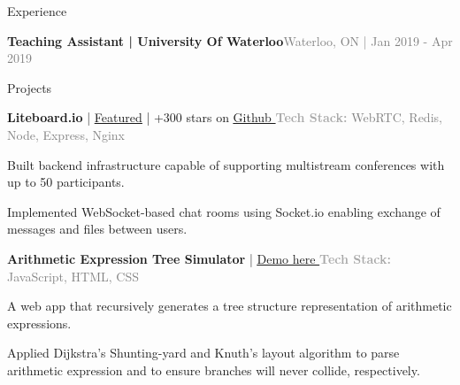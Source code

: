 \documentclass[hidelinks]{resume} %
\begin{document}
\begin{rSection}{Experience}
\begin{rSubsection}{\textbf{Teaching Assistant | University Of Waterloo}}{\textcolor{gray}{\small Waterloo, ON | Jan 2019 - Apr 2019}}{}
\end{rSubsection}

\end{rSection}

\vspace{-.05cm}


\begin{rSection}{Projects}
\vspace{-.1cm}
\begin{rSubsection}{\textbf{Liteboard.io} | \href{https://falauniversidades.com.br/projeto-gratuito-simplifica-o-acesso-as-aulas-on-line/}{\underline{Featured}} | +300 stars on \href{https://github.com/jeverd/lecture-experience}{\underline{Github} \faGithub}}{\small \textcolor{darkgray}{\textbf{Tech Stack:} \textcolor{gray}{WebRTC, Redis, Node, Express, Nginx}}}{}
        \par
        \begin{bulletpoints}
            \vspace{-.10cm}
            \item Built backend infrastructure capable of supporting multistream conferences with up to 50 participants. 
            \vspace{-.13cm}
            \item Implemented WebSocket-based chat rooms using Socket.io enabling exchange of messages and files between users.
            \vspace{-.10cm}
        \end{bulletpoints}
\end{rSubsection}

\begin{rSubsection}{{\textbf{Arithmetic Expression Tree Simulator}} |
\href{https://lnogueir.github.io/expression-tree-gen/}{\underline{Demo here } \faGithub}}{\small \textcolor{darkgray}{\textbf{Tech Stack:} \textcolor{gray}{JavaScript, HTML, CSS}}}{}
\par
    \begin{bulletpoints}
        \vspace{-.10cm}
        \item A web app that recursively generates a tree structure representation of arithmetic expressions.
        \vspace{-.13cm}
        \item Applied Dijkstra's Shunting-yard and Knuth's layout algorithm to parse arithmetic expression and to ensure branches will never collide, respectively.
        \vspace{-.25cm}
    \end{bulletpoints}
\end{rSubsection}

\end{rSection}






\end{document}
